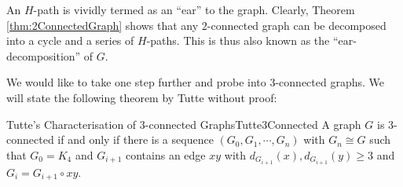 \documentclass[math, code]{amznotes}
\theoremstyle{remark}
\begin{document}
An $H$-path is vividly termed as an ``ear'' to the graph. Clearly, Theorem \ref{thm:2ConnectedGraph} shows that any $2$-connected graph can be decomposed into a cycle and a series of $H$-paths. This is thus also known as the ``ear-decomposition'' of $G$.

We would like to take one step further and probe into $3$-connected graphs. We will state the following theorem by Tutte without proof:
\begin{thmbox}{Tutte's Characterisation of $3$-connected Graphs}{Tutte3Connected}
    A graph $G$ is $3$-connected if and only if there is a sequence $\left(G_0, G_1, \cdots, G_n\right)$ with $G_n \cong G$ such that $G_0 = K_4$ and $G_{i + 1}$ contains an edge $xy$ with $d_{G_{i + 1}}(x), d_{G_{i + 1}}(y) \geq 3$ and $G_i = G_{i + 1} \circ xy$. 
\end{thmbox}
\end{document}
